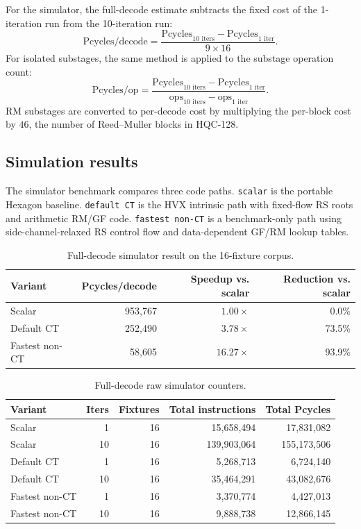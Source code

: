 \documentclass[runningheads]{llncs}
\begin{document}
For the simulator, the full-decode estimate subtracts the fixed cost of the
1-iteration run from the 10-iteration run:
\[
  \text{Pcycles/decode} =
  \frac{\text{Pcycles}_{10\text{ iters}}-\text{Pcycles}_{1\text{ iter}}}
       {9 \times 16}.
\]
For isolated substages, the same method is applied to the substage operation
count:
\[
  \text{Pcycles/op} =
  \frac{\text{Pcycles}_{10\text{ iters}}-\text{Pcycles}_{1\text{ iter}}}
       {\text{ops}_{10\text{ iters}}-\text{ops}_{1\text{ iter}}}.
\]
RM substages are converted to per-decode cost by multiplying the per-block
cost by \(46\), the number of Reed--Muller blocks in HQC-128.

\subsection{Simulation results}

The simulator benchmark compares three code paths.  \texttt{scalar} is the
portable Hexagon baseline.  \texttt{default CT} is the HVX intrinsic path with
fixed-flow RS roots and arithmetic RM/GF code.  \texttt{fastest non-CT} is a
benchmark-only path using side-channel-relaxed RS control flow and
data-dependent GF/RM lookup tables.

\begin{table}[t]
\centering
\caption{Full-decode simulator result on the 16-fixture corpus.}
\label{tab:sim-full-derived}
\small
\begin{tabular}{lrrr}
\toprule
Variant & Pcycles/decode & Speedup vs. scalar & Reduction vs. scalar \\
\midrule
Scalar & 953,767 & \(1.00\times\) & 0.0\% \\
Default CT & 252,490 & \(3.78\times\) & 73.5\% \\
Fastest non-CT & 58,605 & \(16.27\times\) & 93.9\% \\
\bottomrule
\end{tabular}
\end{table}

\begin{table}[t]
\centering
\caption{Full-decode raw simulator counters.}
\label{tab:sim-full-raw}
\small
\begin{tabular}{lrrrr}
\toprule
Variant & Iters & Fixtures & Total instructions & Total Pcycles \\
\midrule
Scalar & 1 & 16 & 15,658,494 & 17,831,082 \\
Scalar & 10 & 16 & 139,903,064 & 155,173,506 \\
Default CT & 1 & 16 & 5,268,713 & 6,724,140 \\
Default CT & 10 & 16 & 35,464,291 & 43,082,676 \\
Fastest non-CT & 1 & 16 & 3,370,774 & 4,427,013 \\
Fastest non-CT & 10 & 16 & 9,888,738 & 12,866,145 \\
\bottomrule
\end{tabular}
\end{table}
\end{document}
